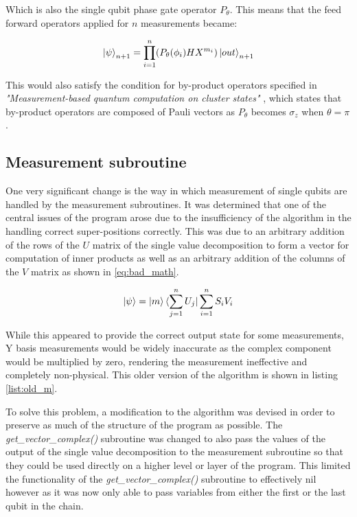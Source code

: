 Which is also the single qubit phase gate operator $P_{\theta}$. This means that the feed forward operators applied for $n$ measurements became:

\begin{equation}
\ket{\psi}_{n + 1} = \prod\limits^{n}_{i= 1} 
(P_{\theta}(\phi_{i}) H X^{m_{i}}) \ket{out}_{n + 1}  
\end{equation}

This would also satisfy the condition for by-product operators specified in \textit{"Measurement-based quantum computation on cluster states"} \citep{raussendorf_measurement-based_2003}, which states that by-product operators are composed of Pauli vectors as $P_{\theta}$ becomes $\sigma_{z}$ when $\theta = \pi$.


\subsection{Measurement subroutine}
\label{subsec:M_subroutine}

One very significant change is the way in which measurement of single qubits are handled by the measurement subroutines. It was determined that one of the central issues of the program arose due to the insufficiency of the algorithm in the handling correct super-positions correctly. This was due to an arbitrary addition of the rows of the $U$ matrix of the single value decomposition to form a vector for computation of inner products as well as an arbitrary addition of the columns of the $V$ matrix as shown in \eqref{eq:bad_math}.

\begin{equation}
\label{eq:bad_math}
\ket{\psi} = \ket{m} \bra{\sum\limits_{j=1}^{n} U_{j}} \sum\limits_{i=1}^{n} S_{i} V_{i}
\end{equation}

While this appeared to provide the correct output state for some measurements, Y basis measurements would be widely inaccurate as the complex component would be multiplied by zero, rendering the measurement ineffective and completely non-physical. This older version of the algorithm is shown in listing \ref{list:old_m}.


To solve this problem, a modification to the algorithm was devised in order to preserve as much of the structure of the program as possible. The \textit{get\_vector\_complex()} subroutine was changed to also pass the values of the output of the single value decomposition to the measurement subroutine so that they could be used directly on a higher level or layer of the program. This limited the functionality of the \textit{get\_vector\_complex()} subroutine to effectively nil however as it was now only able to pass variables from either the first or the last qubit in the chain.

